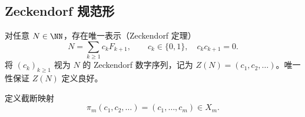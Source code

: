 \subsection{Zeckendorf 规范形}

对任意 $N\in\NN$，存在唯一表示（Zeckendorf 定理）
\[
N=\sum_{k\ge1}c_k F_{k+1},\qquad c_k\in\{0,1\},\quad c_kc_{k+1}=0.
\]
将 $(c_k)_{k\ge1}$ 视为 $N$ 的 Zeckendorf 数字序列，记为 $Z(N)=(c_1,c_2,\dots)$。唯一性保证 $Z(N)$ 定义良好。

定义截断映射
\[
\pi_m(c_1,c_2,\dots)=(c_1,\dots,c_m)\in X_m.
\]
